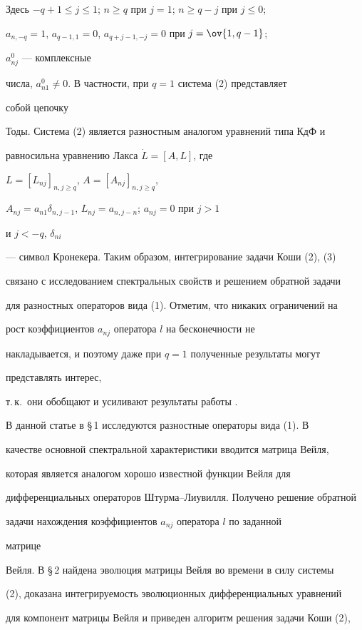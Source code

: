 Здесь $-q+1\le j\le 1$; $n\ge q$ при $j=1$; $n\ge q-j$ при $j\le 0$; 


$a_{n,-q}=1$, $a_{q-1,1}=0$, $a_{q+j-1,-j}=0$ при $j=\ov{1,q-1}$; 


$a^0_{nj}$ --- комплексные 


числа, $a^0_{n1}\ne 0$. В частности, при $q=1$ система (2) представляет 


собой цепочку 


Тоды. Система (2) является разностным аналогом уравнений типа КдФ и 


равносильна уравнению Лакса $\Dot L=[A,L]$, где 


$L=[L_{nj}]_{n,j\ge q}$, $A=[A_{nj}]_{n,j\ge q}$, 


$A_{nj}=a_{n1}\delta_{n,j-1}$, $L_{nj}=a_{n,j-n}$; $a_{nj}=0$ при $j>1$ 


и $j<-q$, $\delta_{ni}$ 


--- символ Кронекера. Таким образом, интегрирование задачи Коши (2), (3) 


связано с исследованием спектральных свойств и решением обратной задачи 


для разностных операторов вида (1). Отметим, что никаких ограничений на 


рост коэффициентов $a_{nj}$ оператора $l$ на бесконечности не 


накладывается, и поэтому даже при $q=1$ полученные результаты могут 


представлять интерес, 


т.\,к.~они обобщают и усиливают результаты работы \cite{6}. 


 


В данной статье в \S\,1 исследуются разностные операторы вида (1). В 


качестве основной спектральной характеристики вводится матрица Вейля, 


которая является аналогом хорошо известной функции Вейля для 


дифференциальных операторов Штурма--Лиувилля. Получено решение обратной 


задачи нахождения коэффициентов $a_{nj}$ оператора $l$ по заданной 


матрице 


Вейля. В \S\,2 найдена эволюция матрицы Вейля во времени в силу системы 


(2), доказана интегрируемость эволюционных дифференциальных уравнений 


для компонент матрицы Вейля и приведен алгоритм решения задачи Коши (2), 


